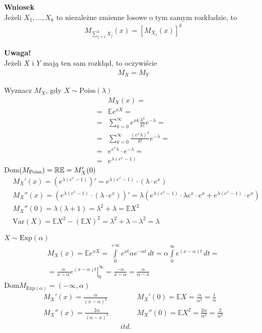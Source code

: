 \textbf{Wniosek}\\
Jeżeli $ X_1,\dots,X_k $ to niezależne zmienne losowe o tym samym rozkładzie, to
\begin{gather*}
M_{\sum_{j=1}^{k}X_j}(x)=\left[M_{X_1}(x)\right]^k
\end{gather*} 

\textbf{Uwaga!}\\
Jeżeli $ X $ i $ Y $  mają ten sam rozkłąd, to oczywiście
\begin{gather*}
M_X=M_Y
\end{gather*}
\begin{prz}
Wyznacz $ M_X $, gdy $ X \sim\text{Poiss}(\lambda)$
\begin{align*}
&M_X(x)
=\\=&
\mathbb E e^{xX}
=\\=&
\sum_{k=0}^{\infty }e^{xk}\frac{\lambda^k}{k!}e^{-\lambda}
=\\=&
\sum_{k=0}^{\infty }\frac{\left(e^{x}\lambda\right)^k}{k!}e^{-\lambda}
=\\=&
e^{e^{x}\lambda}\cdot e^{-\lambda}
=\\=&
e^{\lambda\left(e^{x}-1\right)}
\end{align*}
Dom$ \left(M_\text{Poiss}\right)=\mathbb R\\
\mathbb E =M_X'(0) $
\begin{align*}
&M_X'(x)=
\left(e^{\lambda\left(e^{x}-1\right)}\right)'
=
e^{\lambda\left(e^{x}-1\right)}\cdot \left(\lambda\cdot e^x\right)\\
&M_X''(x)=\left(e^{\lambda\left(e^{x}-1\right)}\cdot \left(\lambda\cdot e^x\right)\right)'
=
\lambda\left(e^{\lambda\left(e^{x}-1\right)}\cdot \lambda e^x\cdot e^x+e^{\lambda\left(e^{x}-1\right)}\cdot e^x\right)\\
&M_X''(0)
=
\lambda(\lambda+1)=\lambda^2+\lambda=\mathbb E X^2\\
&\text{Var}(X)=\mathbb E X^2-\left(\mathbb E X\right)^2
=
\lambda^2+\lambda-\lambda^2=\lambda
\end{align*}
\end{prz}
\begin{prz}
$ X\sim \text{Exp}(\alpha) $
\begin{gather*}
M_X(x)=\mathbb E e^{xX}=
\int\limits_{0}^{+\infty }e^{xt}\alpha e^{-\alpha t}\,dt
=
\alpha\int\limits_{0}^{\infty }e^{(x-\alpha)t}\,dt
=\\=
\left.\frac{\alpha}{x-\alpha}e^{(x-\alpha)t}\right|_0^\infty 
=
\frac{-\alpha}{x-\alpha}
=
\frac{\alpha}{\alpha-x}
\end{gather*}
Dom$ M_{\text{Exp}(\alpha)}=(-\infty ,\alpha) $
\begin{align*}
M_X'(x)=\frac{\alpha}{(x-\alpha)^2}&&&M_X'(0)=\mathbb E X=\frac{\alpha}{\alpha^2}=\frac{1}{\alpha}\\
M_X''(x)=\frac{2\alpha}{(\alpha-x)^3}&&&M_X''(0)=\mathbb E X^2=\frac{2\alpha}{\alpha^3}=\frac{2}{\alpha^2}\\
&&itd.
\end{align*}
\end{prz}
